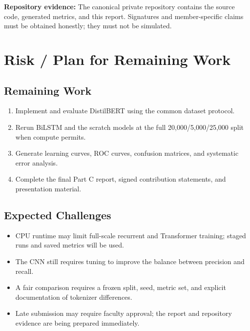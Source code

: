 \documentclass[10pt,a4paper]{article}
\begin{document}
\noindent\textbf{Repository evidence:} The canonical private repository contains the source code, generated metrics, and this report. Signatures and member-specific claims must be obtained honestly; they must not be simulated.

\section{Risk / Plan for Remaining Work}
\subsection*{Remaining Work}
\begin{enumerate}[nosep]
\item Implement and evaluate DistilBERT using the common dataset protocol.
\item Rerun BiLSTM and the scratch models at the full 20,000/5,000/25,000 split when compute permits.
\item Generate learning curves, ROC curves, confusion matrices, and systematic error analysis.
\item Complete the final Part C report, signed contribution statements, and presentation material.
\end{enumerate}

\subsection*{Expected Challenges}
\begin{itemize}[nosep]
\item CPU runtime may limit full-scale recurrent and Transformer training; staged runs and saved metrics will be used.
\item The CNN still requires tuning to improve the balance between precision and recall.
\item A fair comparison requires a frozen split, seed, metric set, and explicit documentation of tokenizer differences.
\item Late submission may require faculty approval; the report and repository evidence are being prepared immediately.
\end{itemize}
\end{document}
